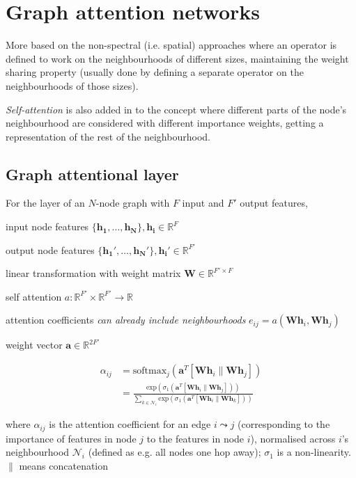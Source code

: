 \section{Graph attention networks}
\label{training-gat}
\cite{velickovic2018graph} More based on the non-spectral (i.e. spatial) approaches where an operator is defined to work on the neighbourhoods of different sizes, maintaining the weight sharing property (usually done by defining a separate operator on the neighbourhoods of those sizes).


\textit{Self-attention} is also added in to the concept where different parts of the node's neighbourhood are considered with different importance weights, getting a representation of the rest of the neighbourhood. 


\subsection{Graph attentional layer}
For the layer of an $N$-node graph with $F$ input and $F'$ output features, 

input node features $\{\mathbf{h_1}, \dots, \mathbf{h_N}\}, \mathbf{h_i} \in \mathbb{R}^F$

output node features $\{\mathbf{h_1'}, \dots, \mathbf{h_N'}\}, \mathbf{h_i'} \in \mathbb{R}^{F'}$

linear transformation with weight matrix $\mathbf{W} \in \mathbb{R}^{F' \times F}$

self attention $a: \mathbb{R}^{F'} \times \mathbb{R}^{F'} \rightarrow \mathbb{R}$

attention coefficients \textit{can already include neighbourhoods} $e_{ij} = a(\mathbf{W}\mathbf{h}_i, \mathbf{W}\mathbf{h}_j)$



weight vector $\mathbf{a} \in \mathbb{R}^{2F'}$

\begin{align}
    \alpha_{ij} &= \mathrm{softmax}_j(\mathbf{a}^T[\mathbf{W}\mathbf{h}_i \parallel \mathbf{W}\mathbf{h}_j]) \\
    &=  \frac{\mathrm{exp}(\sigma_1(\mathbf{a}^T[\mathbf{W}\mathbf{h}_i \parallel \mathbf{W}\mathbf{h}_j]))}{\sum\limits_{k \in \mathcal{N}_i}\mathrm{exp}(\sigma_1(\mathbf{a}^T[\mathbf{W}\mathbf{h}_i \parallel \mathbf{W}\mathbf{h}_k]))}
\end{align}

where $\alpha_{ij}$ is the attention coefficient for an edge $i\leadsto j$ (corresponding to the importance of features in node $j$ to the features in node $i$), normalised across $i$'s neighbourhood $\mathcal{N}_i$ (defined as e.g. all nodes one hop away); $\sigma_1$ is a non-linearity. $\parallel$ means concatenation

